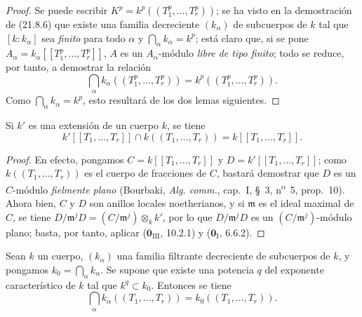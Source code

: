 \begin{proof}
Se puede escribir $K^p=k^p((T_1^p,\ldots,T_r^p))$; se ha visto en la
demostración de (21.8.6) que existe una familia decreciente $(k_\alpha)$ de
subcuerpos de $k$ tal que $[k:k_\alpha]$ sea \emph{finito} para todo $\alpha$ y
$\bigcap_\alpha k_\alpha=k^p$; está claro que, si se pone
$A_\alpha=k_\alpha[[T_1^p,\ldots,T_r^p]]$, $A$ es un $A_\alpha$-módulo \emph{libre
de tipo finito}; todo se reduce, por tanto, a demostrar la relación
\begin{equation}
\tag{21.8.8.1}
\label{0.21.8.8.1-fr}
  \bigcap_\alpha k_\alpha((T_1^p,\ldots,T_r^p))
  =k^p((T_1^p,\ldots,T_r^p)).
\end{equation}
Como $\bigcap_\alpha k_\alpha=k^p$, esto resultará de los dos lemas siguientes.
\end{proof}

\begin{lemma}[21.8.8.2]
\label{0.21.8.8.2-fr}
Si $k'$ es una extensión de un cuerpo $k$, se tiene
\[
  k'[[T_1,\ldots,T_r]]\cap k((T_1,\ldots,T_r))=k[[T_1,\ldots,T_r]].
\]
\end{lemma}

\begin{proof}
En efecto, pongamos $C=k[[T_1,\ldots,T_r]]$ y
$D=k'[[T_1,\ldots,T_r]]$; como $k((T_1,\ldots,T_r))$ es el cuerpo de
fracciones de $C$, bastará demostrar que $D$ es un $C$-módulo
\emph{fielmente plano} (Bourbaki, \emph{Alg. comm.}, cap.~I, \S~3,
n\textsuperscript{o}~5, prop.~10). Ahora bien, $C$ y $D$ son anillos locales
noetherianos, y si $\mathfrak m$ es el ideal maximal de $C$, se tiene
$D/\mathfrak m^jD=(C/\mathfrak m^j)\otimes_k k'$, por lo que
$D/\mathfrak m^jD$ es un $(C/\mathfrak m^j)$-módulo plano; basta, por tanto,
aplicar ($\mathbf 0_{\mathrm{III}}$, 10.2.1) y
($\mathbf 0_{\mathrm I}$, 6.6.2).
\end{proof}

\begin{lemma}[21.8.8.3]
\label{0.21.8.8.3-fr}
Sean $k$ un cuerpo, $(k_\alpha)$ una familia filtrante decreciente de
subcuerpos de $k$, y pongamos $k_0=\bigcap_\alpha k_\alpha$. Se supone que
existe una potencia $q$ del exponente característico de $k$ tal que
$k^q\subset k_0$. Entonces se tiene
\begin{equation}
\tag{21.8.8.4}
\label{0.21.8.8.4-fr}
  \bigcap_\alpha k_\alpha((T_1,\ldots,T_r))=k_0((T_1,\ldots,T_r)).
\end{equation}
\end{lemma}


